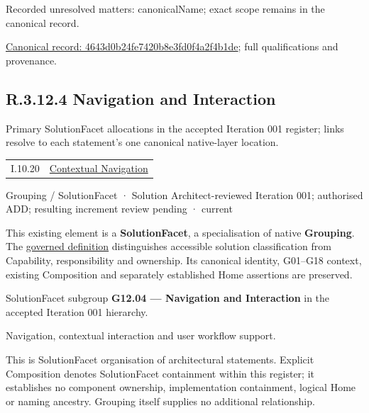 {\small Recorded unresolved matters: canonicalName; exact scope remains in the canonical record.}\par
{\footnotesize \href{../../../../../../../continuum/grouping/4643d0b24fe7420b8e3fd0f4a2f4b1de.md}{Canonical record: 4643d0b24fe7420b8e3fd0f4a2f4b1de}; full qualifications and provenance.}\par
\subsection*{R.3.12.4 Navigation and Interaction}
\label{navigation:R.3.12.4}

Primary SolutionFacet allocations in the accepted Iteration 001 register; links resolve to each statement’s one canonical native-layer location.\par
\begin{longtable}{p{.22\linewidth}p{.73\linewidth}}
I.10.20 & \hyperref[element:39d698ff446d48ab9358844666fcafe5]{Contextual Navigation} \\
\end{longtable}
\label{element:9f192036bee542ad883b89729a35bbfb}
{\small Grouping / SolutionFacet · Solution Architect-reviewed Iteration 001; authorised ADD; resulting increment review pending · current}\par

This existing element is a \textbf{SolutionFacet}, a specialisation of native
\textbf{Grouping}. The \href{\detokenize{../../../../../../../governance/continuum-representation.md#solutionfacet-classification--1119-candidate}}{governed definition}
distinguishes accessible solution classification from Capability, responsibility
and ownership. Its canonical identity, G01–G18 context, existing Composition
and separately established Home assertions are preserved.



SolutionFacet subgroup \textbf{G12.04 — Navigation and Interaction} in the accepted Iteration 001 hierarchy.



Navigation, contextual interaction and user workflow support.



This is SolutionFacet organisation of architectural statements. Explicit Composition denotes SolutionFacet containment within this register; it establishes no component ownership, implementation containment, logical Home or naming ancestry. Grouping itself supplies no additional relationship.


